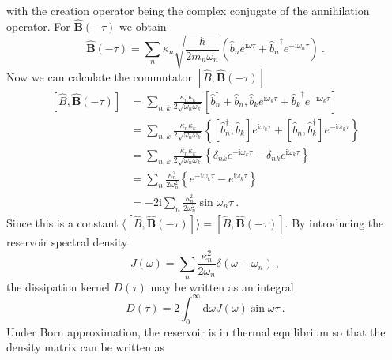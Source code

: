 	with the creation operator being the complex conjugate of the annihilation operator.
	For $\boldsymbol{\hat{B}}(-\tau)$ we obtain
	\begin{equation}
		\boldsymbol{\hat{B}}(-\tau) =	\sum_n \kappa_n \sqrt{\frac{\hbar}{2 m_n \omega_n}} \left({\hat{b}_n}e^{\mathrm{i} \omega \tau} + {\hat{b}_n}^\dagger e^{-\mathrm{i} \omega_n \tau} \right)~.
	\end{equation}
	Now we can calculate the commutator $[\hat{B}, \boldsymbol{\hat{B}}(-\tau) ]$
	\begin{equation} \label{Eq::Bath-commutator-calculation}
		\begin{split}
			\left[\hat{B}, \boldsymbol{\hat{B}}(-\tau) \right] &=	\sum_{n,k}^{} \frac{\kappa_n \kappa_k}{2 \sqrt{\omega_n \omega_k}} \left[\hat{b}_n^\dagger + \hat{b}_n , {\hat{b}_k}e^{\mathrm{i} \omega_k \tau} + {\hat{b}_k}^\dagger e^{-\mathrm{i} \omega_k \tau} \right] \\
			&= \sum_{n,k}^{} \frac{\kappa_n \kappa_k}{2 \sqrt{\omega_n \omega_k}} \left\{\left[\hat{b}_n^\dagger, \hat{b}_k\right] e^{\mathrm{i}\omega_k \tau} + \left[\hat{b}_n, \hat{b}_k^\dagger\right] e^{-\mathrm{i}\omega_k \tau}\right\} \\
			&= \sum_{n,k}^{} \frac{\kappa_n \kappa_k}{2 \sqrt{\omega_n \omega_k}} \left\{\delta_{nk} e^{-\mathrm{i}\omega_k \tau} - \delta_{nk} e^{\mathrm{i}\omega_k \tau}\right\} \\
			&= \sum_{n}^{} \frac{\kappa_n^2 }{2 {\omega_n^2}} \left\{e^{-\mathrm{i}\omega_k \tau} - e^{\mathrm{i}\omega_k \tau}\right\} \\
			&= - 2 \mathrm{i}  \sum_{n}^{} \frac{\kappa_n^2 }{2 {\omega_n^2}} \sin \omega_n \tau~.
		\end{split}
	\end{equation}
	Since this is a constant $\langle [\hat{B}, \boldsymbol{\hat{B}}(-\tau) ]  \rangle =	[\hat{B}, \boldsymbol{\hat{B}}(-\tau) ]$. By introducing the reservoir spectral density
	\begin{equation} \label{Eq::spectral-density-delta}
		J(\omega) =	\sum_n 	\frac{\kappa_n^2}{2 \omega_n} \delta(\omega - \omega_n)~,
	\end{equation}
	the dissipation kernel $D(\tau)$ may be written as an integral
	\begin{equation}
		D(\tau) = 2 \int_{0}^{\infty} \text{d}\omega J(\omega) \sin \omega \tau~.
	\end{equation}
	Under Born approximation, the reservoir is in thermal equilibrium so that the density matrix can be written as
